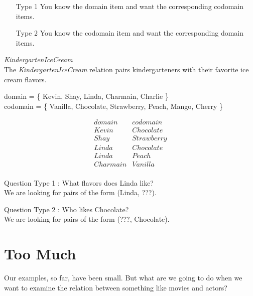 \documentclass{ximera}
\begin{document}
\begin{itemize}
\item [Type 1] You know the domain item and want the corresponding codomain items.
\item [Type 2] You know the codomain item and want the corresponding domain items.
\end{itemize}



\begin{example} \textit{KindergartenIceCream} \\
The \textit{KindergartenIceCream} relation pairs kindergarteners with their favorite ice cream flavors.

domain = \{ Kevin, Shay, Linda, Charmain, Charlie \}  \\
codomain = \{ Vanilla, Chocolate, Strawberry, Peach, Mango, Cherry \} 

\[
\begin{array}{l|l}
    domain      & codomain      \\ \hline
    Kevin   &  Chocolate \\
    Shay   & Strawberry \\
    Linda  &  Chocolate \\
    Linda  &  Peach \\
    Charmain &  Vanilla \\ 
\end{array}
\]


Question Type 1 : What flavors does Linda like? \\
We are looking for pairs of the form (Linda, ???).

Question Type 2 : Who likes Chocolate? \\
We are looking for pairs of the form (???, Chocolate).

\end{example} 



\section{Too Much}

Our examples, so far, have been small.  But what are we going to do when we want to examine the relation between something like movies and actors?  
\end{document}
